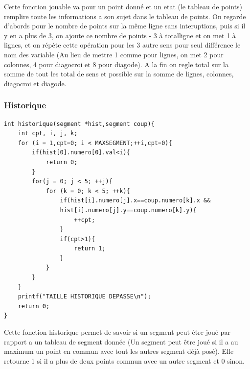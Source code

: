 \documentclass[11pt]{article}
\begin{document}
Cette fonction jouable va pour un point donné et un etat (le tableau de points) remplire toute les informations a son sujet dans le tableau de points. On regarde d'abords pour le nombre de points sur la même ligne sans interuptions, puis si il y en a plus de 3, on ajoute ce nombre de points - 3 à totalligne et on met 1 à lignes, et on répète cette opération pour les 3 autre sens pour seul différence le nom des variable (Au lieu de mettre 1 comme pour lignes, on met 2 pour colonnes, 4 pour diagocroi et 8 pour diagode).
A la fin on regle total sur la somme de tout les total de sens et possible sur la somme de lignes, colonnes, diagocroi et diagode.\\
\subsubsection{Historique}
\begin{lstlisting}
int historique(segment *hist,segment coup){
   	int cpt, i, j, k;
   	for (i = 1,cpt=0; i < MAXSEGMENT;++i,cpt=0){
   		if(hist[0].numero[0].val<i){
   	      	return 0;
   		}
   	    for(j = 0; j < 5; ++j){
   	    	for (k = 0; k < 5; ++k){
   	        	if(hist[i].numero[j].x==coup.numero[k].x &&
   	        	hist[i].numero[j].y==coup.numero[k].y){
   	           		++cpt;
   	           	}
   	           	if(cpt>1){
   	           		return 1;
   	           	}
   	      	}
   		}
   	}
   	printf("TAILLE HISTORIQUE DEPASSE\n");
   	return 0;
}
\end{lstlisting}
Cette fonction historique permet de savoir si un segment peut être joué par rapport a un tableau de segment donnée (Un segment peut être joué si il a au maximum un point en commun avec tout les autres segment déjà posé). Elle retourne 1 si il a plus de deux points commun avec un autre segment et 0 sinon.\\
\end{document}
